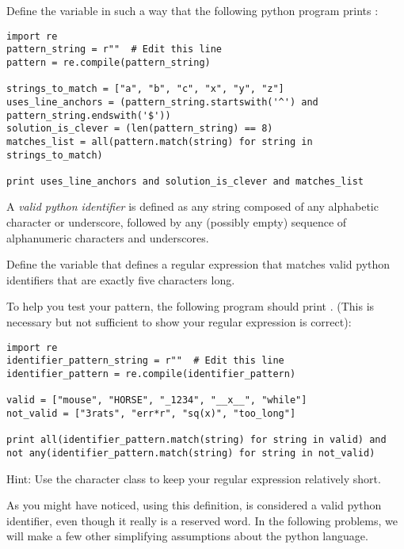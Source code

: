 \begin{problem}
Define the variable  in such a way that the following python program prints :

\begin{lstlisting}
import re
pattern_string = r""  # Edit this line
pattern = re.compile(pattern_string)

strings_to_match = ["a", "b", "c", "x", "y", "z"]
uses_line_anchors = (pattern_string.startswith('^') and pattern_string.endswith('$'))
solution_is_clever = (len(pattern_string) == 8)
matches_list = all(pattern.match(string) for string in strings_to_match)

print uses_line_anchors and solution_is_clever and matches_list
\end{lstlisting}
\end{problem}

\begin{problem}
A \emph{valid python identifier} is defined as any string composed of any alphabetic character or underscore, followed by any (possibly empty) sequence of alphanumeric characters and underscores.

Define the variable  that defines a regular expression that matches valid python identifiers that are exactly five characters long. 

To help you test your pattern, the following program should print . (This is necessary but not sufficient to show your regular expression is correct):
\begin{lstlisting}
import re
identifier_pattern_string = r""  # Edit this line
identifier_pattern = re.compile(identifier_pattern)

valid = ["mouse", "HORSE", "_1234", "__x__", "while"]
not_valid = ["3rats", "err*r", "sq(x)", "too_long"]

print all(identifier_pattern.match(string) for string in valid) and not any(identifier_pattern.match(string) for string in not_valid)
\end{lstlisting}

Hint: Use the  character class to keep your regular expression relatively short.
\begin{info}
As you might have noticed, using this definition,  is considered a valid python identifier, even though it really is a reserved word. In the following problems, we will make a few other simplifying assumptions about the python language.
\end{info}
\end{problem}

